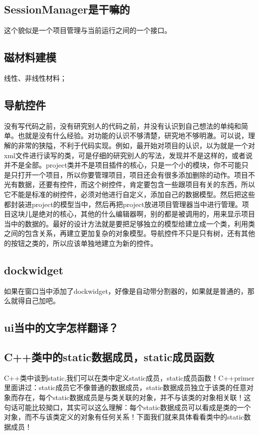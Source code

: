 \subsection{SessionManager是干嘛的}
这个貌似是一个项目管理与当前运行之间的一个接口。
\subsection{磁材料建模}
线性、非线性材料；
\subsection{导航控件}
没有写代码之前，没有研究别人的代码之前，并没有认识到自己想法的单纯和简单。也就是没有什么经验。对功能的认识不够清楚，研究地不够明澈。可以说，理解的非常的狭隘，不利于代码实现。例如，最开始对项目的认识，以为就是一个对xml文件进行读写的类，可是仔细的研究别人的写法，发现并不是这样的，或者说并不是全部。project类并不是项目插件的核心，只是一个小的模块，你不可能只是只打开一个项目，所以你要管理项目，项目还会有很多添加删除的动作。项目不光有数据，还要有控件，而这个树控件，肯定要包含一些跟项目有关的东西，所以它不能是标准的树控件，必须对他进行自定义，添加自己的数据模型。然后把这些都封装进project的模型当中，然后再把project放进项目管理器当中进行管理。项目这块儿是绝对的核心，其他的什么编辑器啊，别的都是被调用的，用来显示项目当中的数据的。最好的设计方法就是要把足够独立的模型给建立成一个类，利用类之间的包含关系，再建立更加复杂的对象模型。导航控件不只是只有树，还有其他的按钮之类的，所以应该单独地建立为新的控件。
\subsection{dockwidget}
如果在窗口当中添加了dockwidget，好像是自动带分割器的，如果就是普通的，那么就得自己加吧。
\subsection{ui当中的文字怎样翻译？}

\subsection{C++类中的static数据成员，static成员函数}
C++类中谈到static,我们可以在类中定义static成员，static成员函数！C++primer里面讲过：static成员它不像普通的数据成员，static数据成员独立于该类的任意对象而存在，每个static数据成员是与类关联的对象，并不与该类的对象相关联！这句话可能比较拗口，其实可以这么理解：每个static数据成员可以看成是类的一个对象，而不与该类定义的对象有任何关系！下面我们就来具体看看类中的static数据成员！

